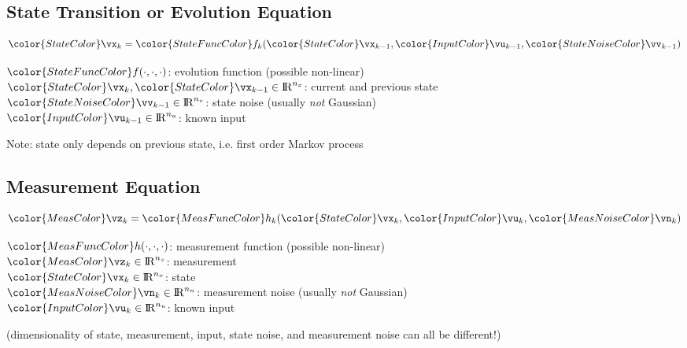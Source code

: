 \documentclass[english,pdftex]{article}
\newcommand{\Realnumbers}{\mathrm{I\!R}}
\begin{document}
\subsection{State Transition or Evolution Equation}
 \[
    {\color{StateColor}\vx_k} = {\color{StateFuncColor}f_k}({\color{StateColor}\vx_{k-1}},
    {\color{InputColor}\vu_{k-1}},{\color{StateNoiseColor}\vv_{k-1}})
 \]

${\color{StateFuncColor}f}(\cdot,\cdot,\cdot)$:
{\color{StateFuncColor}evolution
function} (possible non-linear) \\
${\color{StateColor}\vx_k}, {\color{StateColor}\vx_{k-1}} \in
\Realnumbers^{n_x}$:
current and previous {\color{StateColor}state} \\
${\color{StateNoiseColor}\vv_{k-1}} \in \Realnumbers^{n_v}$:
{\color{StateNoiseColor}state noise}
(usually \emph{not} Gaussian)\\
${\color{InputColor}\vu_{k-1}} \in
\Realnumbers^{n_u}$: known {\color{InputColor}input}

\bigskip
Note: state only depends on previous state, i.e. first order
Markov process




\newpage
\subsection{Measurement Equation}
 \[
    {\color{MeasColor}\vz_k} = {\color{MeasFuncColor}h_k}({\color{StateColor}\vx_k},
    {\color{InputColor}\vu_k},{\color{MeasNoiseColor}\vn_k})
 \]

${\color{MeasFuncColor}h}(\cdot,\cdot,\cdot)$:
{\color{MeasFuncColor}measurement
function} (possible non-linear) \\
${\color{MeasColor}\vz_k} \in
\Realnumbers^{n_z}$: {\color{MeasColor}measurement} \\
${\color{StateColor}\vx_k} \in
\Realnumbers^{n_x}$: {\color{StateColor}state} \\
${\color{MeasNoiseColor}\vn_k} \in \Realnumbers^{n_n}$:
{\color{MeasNoiseColor}measurement noise}
(usually \emph{not} Gaussian)\\
${\color{InputColor}\vu_k} \in
\Realnumbers^{n_u}$: known {\color{InputColor}input}

\bigskip
(dimensionality of {\color{StateColor}state},
{\color{MeasColor}measurement}, {\color{InputColor}input},
{\color{StateNoiseColor}state noise}, and
{\color{MeasNoiseColor}measurement noise} can all be different!)
\end{document}
